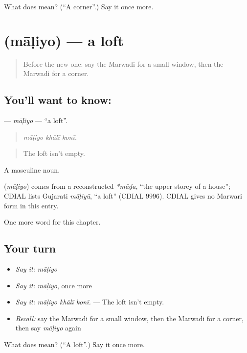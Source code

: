 \begin{tcolorbox}[breakable,colback=teal!4,colframe=teal!35!black,title={Before you move on}]
What does  mean? (\textquotedblleft{}A corner\textquotedblright{}.) Say it once more.
\end{tcolorbox}
\section[\texorpdfstring{\mw{माळियो} (māḷiyo)}{माळियो (māḷiyo)}]{ (māḷiyo) — a loft}

\label{lesson:MW-C187-maliyo}



\begin{quote}
Before the new one: say the Marwadi for a small window, then the Marwadi for a corner.
\end{quote}

\subsection*{You'll want to know: }
\textbf{} — \emph{māḷiyo} — \textquotedblleft{}a loft\textquotedblright{}.

\begin{quote}
  
\end{quote}

\begin{quote}
\emph{māḷiyo khālī konī.}
\end{quote}

\begin{quote}
The loft isn't empty.
\end{quote}

A masculine noun.

\begin{cousinweb}
\textbf{} (\emph{māḷiyo}) comes from a reconstructed \emph{*māḍa}, \textquotedblleft{}the upper storey of a house\textquotedblright{}; CDIAL lists Gujarati \emph{māḷiyũ}, \textquotedblleft{}a loft\textquotedblright{} (CDIAL 9996). CDIAL gives no Marwari form in this entry.
\end{cousinweb}

\begin{grammarlens}[title={What you've built}]
One more word for this chapter.
\end{grammarlens}

\subsection*{Your turn}
\begin{itemize}
\raggedright
  \item \emph{Say it:} \emph{māḷiyo}
  \item \emph{Say it:} \emph{māḷiyo}, once more
  \item \emph{Say it:} \emph{māḷiyo khālī konī.} — The loft isn't empty.
  \item \emph{Recall:} say the Marwadi for a small window, then the Marwadi for a corner, then say \emph{māḷiyo} again
\end{itemize}

\begin{tcolorbox}[breakable,colback=teal!4,colframe=teal!35!black,title={Before you move on}]
What does  mean? (\textquotedblleft{}A loft\textquotedblright{}.) Say it once more.
\end{tcolorbox}
